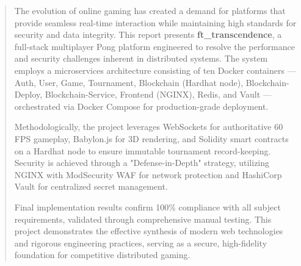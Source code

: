 \documentclass[11pt,a4paper]{report}
\begin{document}
\begin{abstract}
\emergencystretch=10pt

The evolution of online gaming has created a demand for platforms that provide seamless real-time interaction while maintaining high standards for security and data integrity. This report presents \textbf{ft\_transcendence}, a full-stack multiplayer Pong platform engineered to resolve the performance and security challenges inherent in distributed systems. The system employs a microservices architecture consisting of ten Docker containers --- Auth, User, Game, Tournament, Blockchain (Hardhat node), Blockchain-Deploy, Blockchain-Service, Frontend (NGINX), Redis, and Vault --- orchestrated via Docker Compose for production-grade deployment.

Methodologically, the project leverages WebSockets for authoritative 60 FPS gameplay, Babylon.js for 3D rendering, and Solidity smart contracts on a Hardhat node to ensure immutable tournament record-keeping. Security is achieved through a "Defense-in-Depth" strategy, utilizing NGINX with ModSecurity WAF for network protection and HashiCorp Vault for centralized secret management.

Final implementation results confirm 100\% compliance with all subject requirements, validated through comprehensive manual testing. This project demonstrates the effective synthesis of modern web technologies and rigorous engineering practices, serving as a secure, high-fidelity foundation for competitive distributed gaming.

\end{abstract}

\tableofcontents
\clearpage
\listoffigures
{}
\clearpage
\listoftables
{}
\clearpage

\end{document}
